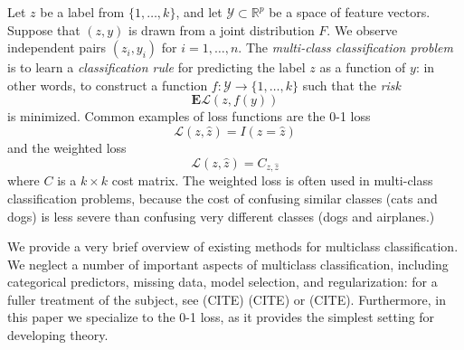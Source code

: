 \documentclass{article}
\newcommand{\E}{\textbf{E}}
\begin{document}
Let $z$ be a label from $\{1,\hdots,k\}$, and let $\mathcal{Y} \subset \mathbb{R}^p$
be a space of feature vectors.  Suppose that $(z, y)$ is drawn from a joint distribution $F$.
We observe independent pairs $(z_i, y_i)$ for $i = 1,\hdots, n$.
The \emph{multi-class classification problem} is to learn a \emph{classification rule}
for predicting the label $z$ as a function of $y$:
in other words, to construct a function $f:\mathcal{Y} \to \{1,\hdots, k\}$
such that the \emph{risk}
\[
\E \mathcal{L}(z, f(y))
\]
is minimized.
Common examples of loss functions are the 0-1 loss \[\mathcal{L}(z, \hat{z}) = I(z = \hat{z})\]
and the weighted loss
\[
\mathcal{L}(z, \hat{z}) = C_{z, \hat{z}}
\]
where $C$ is a $k \times k$ cost matrix.
The weighted loss is often used in multi-class classification problems, because the cost of confusing similar classes (cats and dogs)
is less severe than confusing very different classes (dogs and airplanes.)

We provide a very brief overview of existing methods for multiclass classification.  We neglect a number of important
aspects of multiclass classification, including categorical predictors, missing data, model selection,
and regularization: for a fuller treatment of the subject, see (CITE) (CITE) or (CITE).
Furthermore, in this paper we specialize to the 0-1 loss, as it provides the simplest setting for developing theory.
\end{document}

